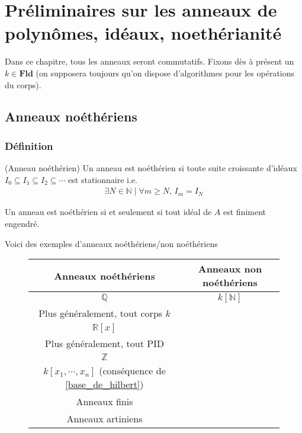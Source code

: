 \chapter{Préliminaires sur les anneaux de polynômes, idéaux, noethérianité}
    Dans ce chapitre, tous les anneaux seront commutatifs. Fixons dès à présent un $k \in \mathbf{Fld}$ (on supposera toujours qu'on dispose d'algorithmes pour les opérations du corps). 
    \section{Anneaux noéthériens}
        \subsection{Définition}
            \begin{defi} (Anneau noéthérien)
                Un anneau est noéthérien si toute suite croissante d'idéaux $I_0 \subseteq I_1 \subseteq I_2 \subseteq \cdots$ est stationnaire i.e. 
                \begin{align*}
                    \exists N \in \mathbb{N} \mid \forall m \geq N,\, I_m = I_N 
                \end{align*}
            \end{defi}
            \begin{prop}
                Un anneau est noéthérien si et seulement si tout idéal de $A$ est finiment engendré. 
            \end{prop}
            \begin{expl}
                Voici des exemples d'anneaux noéthériens/non noéthériens
                \begin{figure}[H]
                    \centering
                    \begin{tabular}{c|c}
                        Anneaux noéthériens & Anneaux non noéthériens \\
                        \hline
                        $\mathbb{Q}$ & $k[\mathbb{N}]$ \\
                        Plus généralement, tout corps $k$ & \\
                        $\mathbb{R}[x]$ & \\
                        Plus généralement, tout PID & \\
                        $\mathbb{Z}$ & \\
                        $k[x_1, \cdots, x_n]$ (conséquence de \ref{base_de_hilbert}) & \\
                        Anneaux finis & \\
                        Anneaux artiniens & \\
                    \end{tabular}
                \end{figure}
            \end{expl}

